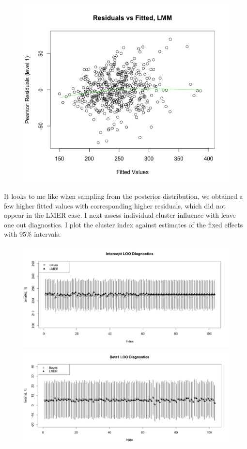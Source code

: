 \documentclass[11pt]{article}
\begin{document}
\begin{enumerate}
\begin{enumerate}
\begin{figure}[H]
		\includegraphics[scale=0.4]{Rplotp2b4.png}
	\end{figure}
	It looks to me like when sampling from the posterior distribution, we obtained  a few higher fitted values with corresponding higher residuals, which did not appear in the LMER case. I next assess individual cluster influence with leave one out diagnostics. I plot the cluster index against estimates of the fixed effects with 95\% intervals.
	\begin{figure}[H]
		\includegraphics[scale=0.4]{Rplotp2b5}
		\includegraphics[scale=0.4]{Rplotp2b6}

\end{figure}
\end{enumerate}
\end{enumerate}
\end{document}
